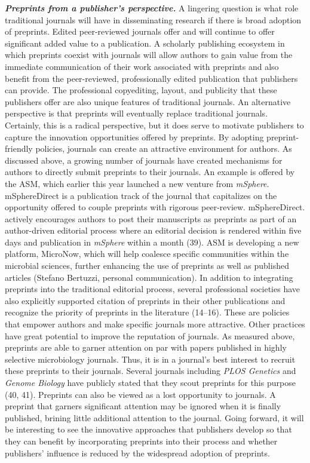 \documentclass[11pt,]{article}
\begin{document}
\textbf{\emph{Preprints from a publisher's perspective.}} A lingering
question is what role traditional journals will have in disseminating
research if there is broad adoption of preprints. Edited peer-reviewed
journals offer and will continue to offer significant added value to a
publication. A scholarly publishing ecosystem in which preprints coexist
with journals will allow authors to gain value from the immediate
communication of their work associated with preprints and also benefit
from the peer-reviewed, professionally edited publication that
publishers can provide. The professional copyediting, layout, and
publicity that these publishers offer are also unique features of
traditional journals. An alternative perspective is that preprints will
eventually replace traditional journals. Certainly, this is a radical
perspective, but it does serve to motivate publishers to capture the
innovation opportunities offered by preprints. By adopting
preprint-friendly policies, journals can create an attractive
environment for authors. As discussed above, a growing number of
journals have created mechanisms for authors to directly submit
preprints to their journals. An example is offered by the ASM, which
earlier this year launched a new venture from \emph{mSphere}.
mSphereDirect is a publication track of the journal that capitalizes on
the opportunity offered to couple preprints with rigorous peer-review.
mSphereDirect. actively encourages authors to post their manuscripts as
preprints as part of an author-driven editorial process where an
editorial decision is rendered within five days and publication in
\emph{mSphere} within a month (39). ASM is developing a new platform,
MicroNow, which will help coalesce specific communities within the
microbial sciences, further enhancing the use of preprints as well as
published articles (Stefano Bertuzzi, personal communication). In
addition to integrating preprints into the traditional editorial
process, several professional societies have also explicitly supported
citation of preprints in their other publications and recognize the
priority of preprints in the literature (14--16). These are policies
that empower authors and make specific journals more attractive. Other
practices have great potential to improve the reputation of journals. As
measured above, preprints are able to garner attention on par with
papers published in highly selective microbiology journals. Thus, it is
in a journal's best interest to recruit these preprints to their
journals. Several journals including \emph{PLOS Genetics} and
\emph{Genome Biology} have publicly stated that they scout preprints for
this purpose (40, 41). Preprints can also be viewed as a lost
opportunity to journals. A preprint that garners significant attention
may be ignored when it is finally published, brining little additional
attention to the journal. Going forward, it will be interesting to see
the innovative approaches that publishers develop so that they can
benefit by incorporating preprints into their process and whether
publishers' influence is reduced by the widespread adoption of
preprints.
\end{document}
